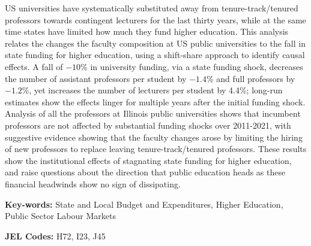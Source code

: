 US universities have systematically substituted away from tenure-track/tenured professors towards contingent lecturers for the last thirty years, while at the same time states have limited how much they fund higher education.
This analysis relates the changes the faculty composition at US public universities to the fall in state funding for higher education, using a shift-share approach to identify causal effects.
A fall of $-10$\% in university funding, via a state funding shock, decreases the number of assistant professors per student by $-1.4$\% and full professors by $-1.2$\%, yet increases the number of lecturers per student by 4.4\%; long-run estimates show the effects linger for multiple years after the initial funding shock.
Analysis of all the professors at Illinois public universities shows that incumbent professors are not affected by substantial funding shocks over 2011-2021, with suggestive evidence showing that the faculty changes arose by limiting the hiring of new professors to replace leaving tenure-track/tenured professors.
These results show the institutional effects of stagnating state funding for higher education, and raise questions about the direction that public education heads as these financial headwinds show no sign of dissipating.

\vfill
\noindent
\textbf{Key-words:}
State and Local Budget and Expenditures,
Higher Education,
Public Sector Labour Markets

\vspace{0.1cm}
\noindent
\textbf{JEL Codes:} H72, I23, J45
